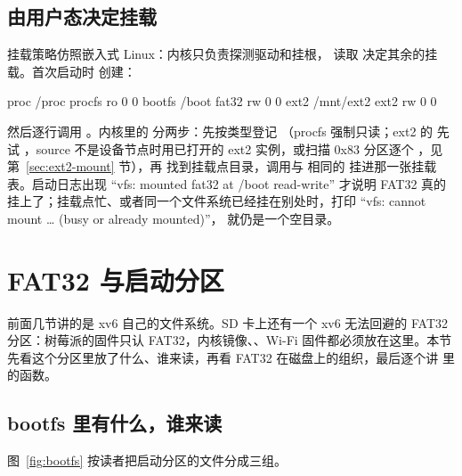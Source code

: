 \subsection{由用户态决定挂载}

挂载策略仿照嵌入式 Linux：内核只负责探测驱动和挂根， 读取  决定其余的挂载。首次启动时  创建：

\begin{txtcode}
proc    /proc      procfs ro 0 0
bootfs  /boot      fat32  rw 0 0
ext2    /mnt/ext2  ext2   rw 0 0
\end{txtcode}

然后逐行调用 。内核里的  分两步：先按类型登记 （procfs 强制只读；ext2 的  先试 ，source 不是设备节点时用已打开的 ext2 实例，或扫描 0x83 分区逐个 ，见第~\ref{sec:ext2-mount} 节），再  找到挂载点目录，调用与  相同的  挂进那一张挂载表。启动日志出现 “vfs: mounted fat32 at /boot read-write” 才说明 FAT32 真的挂上了；挂载点忙、或者同一个文件系统已经挂在别处时，打印 “vfs: cannot mount … (busy or already mounted)”， 就仍是一个空目录。

\section{FAT32 与启动分区}
\label{sec:fat32}

前面几节讲的是 xv6 自己的文件系统。SD 卡上还有一个 xv6 无法回避的 FAT32 分区：树莓派的固件只认 FAT32，内核镜像、、Wi-Fi 固件都必须放在这里。本节先看这个分区里放了什么、谁来读，再看 FAT32 在磁盘上的组织，最后逐个讲  里的函数。

\subsection{bootfs 里有什么，谁来读}

图~\ref{fig:bootfs} 按读者把启动分区的文件分成三组。

